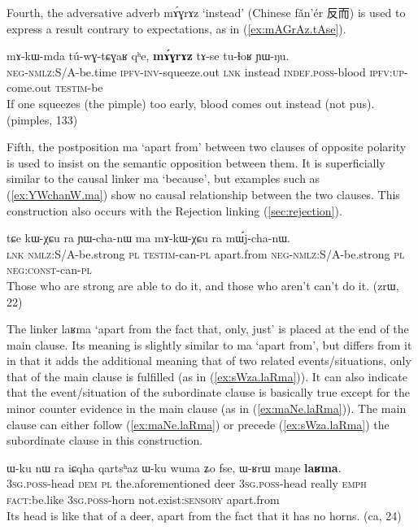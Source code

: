 \documentclass[oldfontcommands,oneside,a4paper,11pt]{article}
\newcommand{\ipa}[1]{{\phon \mbox{#1}}} %
\newcommand{\zh}[1]{{\cn #1}}
\newcommand{\refb}[1]{(\ref{#1})}
\begin{document}
Fourth, the adversative adverb \ipa{mɤ́ɣrɤz} `instead' (Chinese \ipa{fǎn'ér} \zh{反而}) is used to express a result contrary to expectations, as in  \refb{ex:mAGrAz.tAse}.  

\begin{exe}
\ex \label{ex:mAGrAz.tAse}
\gll
 \ipa{mɤ-kɯ-mda}    	\ipa{tú-wɣ-tɕɣaʁ}    	\ipa{qʰe,}    	\ipa{\textbf{mɤ́ɣrɤz}}    	\ipa{tɤ-se}    	\ipa{tu-ɬoʁ}    	\ipa{ɲɯ-ŋu.}    \\
 \textsc{neg-nmlz:S/A}-be.time \textsc{ipfv-inv}-squeeze.out \textsc{lnk} instead \textsc{indef.poss}-blood \textsc{ipfv:up}-come.out \textsc{testim}-be  \\
\glt If one squeezes (the pimple) too early, blood comes out instead (not pus). (pimples, 133)
 \end{exe}
 

Fifth, the  postposition \ipa{ma} `apart from' between two clauses of opposite polarity is used to insist on the semantic opposition between them.  It is superficially similar to the causal linker \ipa{ma} `because', but   examples such as \refb{ex:YWchanW.ma} show no causal relationship between the two clauses. This construction  also occurs with the Rejection linking \refb{sec:rejection}.
\begin{exe}
\ex \label{ex:YWchanW.ma}
\gll
\ipa{tɕe}  	\ipa{kɯ-χɕu}  	\ipa{ra}  	\ipa{ɲɯ-cha-nɯ}  	\ipa{ma}  	\ipa{mɤ-kɯ-χɕu}  	\ipa{ra}  	\ipa{mɯ́j-cha-nɯ.}  \\
\textsc{lnk} \textsc{nmlz}:S/A-be.strong \textsc{pl} \textsc{testim}-can-\textsc{pl} apart.from \textsc{neg-nmlz}:S/A-be.strong \textsc{pl} \textsc{neg:const}-can-\textsc{pl} \\
\glt Those who are strong are able to do it, and those who aren't can't do it. (zrɯ, 22)
\end{exe}

The   linker  \ipa{laʁma} `apart from the fact that, only, just' is placed at the end of the main clause. Its meaning is slightly similar to \ipa{ma} `apart from', but differs from it in that it adds the additional meaning that of two related events/situations, only that of the main clause is fulfilled (as in \refb{ex:sWza.laRma}). It can also indicate that the event/situation of the subordinate clause is basically true except for the minor counter evidence in the main clause  (as in \refb{ex:maNe.laRma}).   The main clause can either follow \refb{ex:maNe.laRma} or precede \refb{ex:sWza.laRma} the subordinate clause in this construction.
  \begin{exe}
\ex \label{ex:maNe.laRma}
\gll
\ipa{ɯ-ku}  	\ipa{nɯ} \ipa{ra}   	\ipa{iɕqha}  	\ipa{qartsʰaz}  	\ipa{ɯ-ku}  	\ipa{wuma}  	\ipa{ʑo}  	\ipa{fse,}  	\ipa{ɯ-ʁrɯ}  	\ipa{maŋe}  	\ipa{\textbf{laʁma}.}  	\\
\textsc{3sg.poss}-head \textsc{dem} \textsc{pl} the.aforementioned deer \textsc{3sg.poss}-head  really \textsc{emph} \textsc{fact}:be.like \textsc{3sg.poss}-horn not.exist:\textsc{sensory} apart.from \\
\glt Its head is like that of a deer, apart from the fact that it has no  horns. (ca, 24)
\end{exe} 
\end{document}
